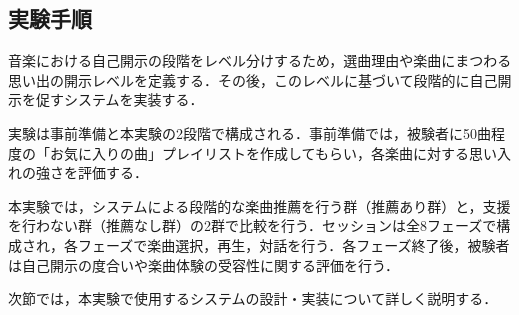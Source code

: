 \subsection{実験手順}\label{実験手順}

音楽における自己開示の段階をレベル分けするため，選曲理由や楽曲にまつわる思い出の開示レベルを定義する．その後，このレベルに基づいて段階的に自己開示を促すシステムを実装する．

実験は事前準備と本実験の2段階で構成される．事前準備では，被験者に50曲程度の「お気に入りの曲」プレイリストを作成してもらい，各楽曲に対する思い入れの強さを評価する．

本実験では，システムによる段階的な楽曲推薦を行う群（推薦あり群）と，支援を行わない群（推薦なし群）の2群で比較を行う．セッションは全8フェーズで構成され，各フェーズで楽曲選択，再生，対話を行う．各フェーズ終了後，被験者は自己開示の度合いや楽曲体験の受容性に関する評価を行う．

次節では，本実験で使用するシステムの設計・実装について詳しく説明する．
